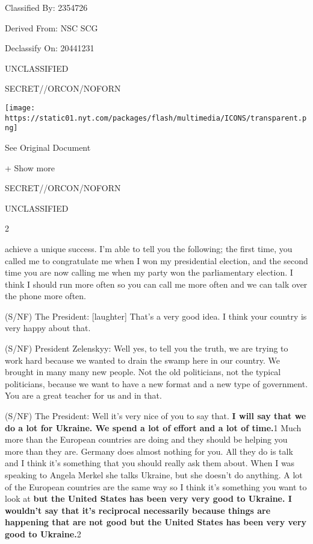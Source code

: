 Classified By: 2354726

Derived From: NSC SCG

Declassify On: 20441231

UNCLASSIFIED

SECRET//ORCON/NOFORN

\protect\hyperlink{}{}

\texttt{[image: https://static01.nyt.com/packages/flash/multimedia/ICONS/transparent.png]}

See Original Document

+ Show more

SECRET//ORCON/NOFORN

UNCLASSIFIED

2

achieve a unique success. I'm able to tell you the following; the first
time, you called me to congratulate me when I won my presidential
election, and the second time you are now calling me when my party won
the parliamentary election. I think I should run more often so you can
call me more often and we can talk over the phone more often.

(S/NF) The President: {[}laughter{]} That's a very good idea. I think
your country is very happy about that.

(S/NF) President Zelenskyy: Well yes, to tell you the truth, we are
trying to work hard because we wanted to drain the swamp here in our
country. We brought in many many new people. Not the old politicians,
not the typical politicians, because we want to have a new format and a
new type of government. You are a great teacher for us and in that.

(S/NF) The President: Well it's very nice of you to say that. \textbf{I
will say that we do a lot for Ukraine. We spend a lot of effort and a
lot of time.}1 Much more than the European countries are doing and they
should be helping you more than they are. Germany does almost nothing
for you. All they do is talk and I think it's something that you should
really ask them about. When I was speaking to Angela Merkel she talks
Ukraine, but she doesn't do anything. A lot of the European countries
are the same way so I think it's something you want to look at
\textbf{but the United States has been very very good to Ukraine. I
wouldn't say that it's reciprocal necessarily because things are
happening that are not good but the United States has been very very
good to Ukraine.}2

